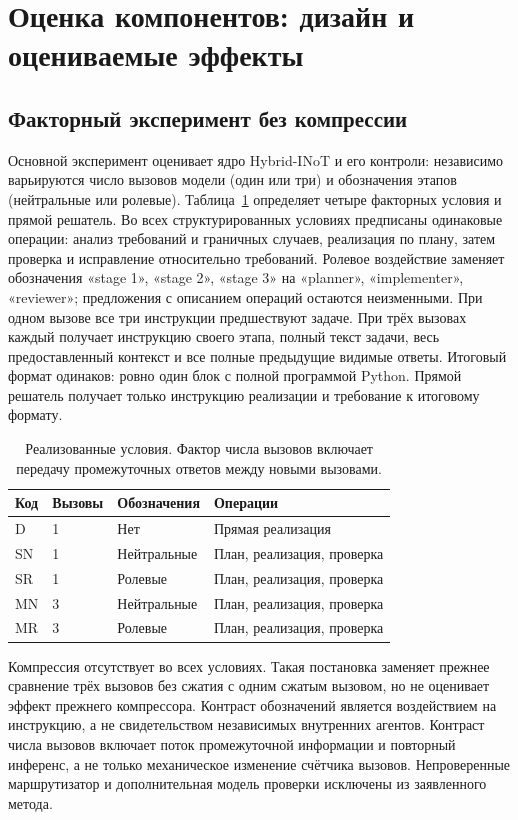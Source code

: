 \section{Оценка компонентов: дизайн и оцениваемые эффекты}
\label{sec:heldout-methods}

\subsection{Факторный эксперимент без компрессии}
Основной эксперимент оценивает ядро Hybrid-INoT и его контроли: независимо варьируются число вызовов модели (один или три) и обозначения этапов (нейтральные или ролевые). Таблица~\ref{tab:design} определяет четыре факторных условия и прямой решатель. Во всех структурированных условиях предписаны одинаковые операции: анализ требований и граничных случаев, реализация по плану, затем проверка и исправление относительно требований. Ролевое воздействие заменяет обозначения «stage 1», «stage 2», «stage 3» на «planner», «implementer», «reviewer»; предложения с описанием операций остаются неизменными. При одном вызове все три инструкции предшествуют задаче. При трёх вызовах каждый получает инструкцию своего этапа, полный текст задачи, весь предоставленный контекст и все полные предыдущие видимые ответы. Итоговый формат одинаков: ровно один блок с полной программой Python. Прямой решатель получает только инструкцию реализации и требование к итоговому формату.

\begin{table}[htbp]\centering
\caption{Реализованные условия. Фактор числа вызовов включает передачу промежуточных ответов между новыми вызовами.}\label{tab:design}
\begin{tabular}{llll}\toprule
Код & Вызовы & Обозначения & Операции\\\midrule
D & 1 & Нет & Прямая реализация\\
SN & 1 & Нейтральные & План, реализация, проверка\\
SR & 1 & Ролевые & План, реализация, проверка\\
MN & 3 & Нейтральные & План, реализация, проверка\\
MR & 3 & Ролевые & План, реализация, проверка\\\bottomrule
\end{tabular}\end{table}

Компрессия отсутствует во всех условиях. Такая постановка заменяет прежнее сравнение трёх вызовов без сжатия с одним сжатым вызовом, но не оценивает эффект прежнего компрессора. Контраст обозначений является воздействием на инструкцию, а не свидетельством независимых внутренних агентов. Контраст числа вызовов включает поток промежуточной информации и повторный инференс, а не только механическое изменение счётчика вызовов. Непроверенные маршрутизатор и дополнительная модель проверки исключены из заявленного метода.

